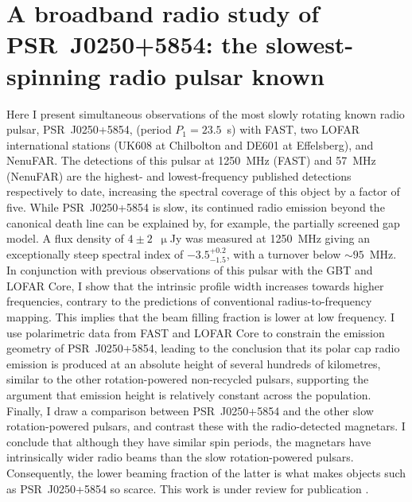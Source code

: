 \chapter[A broadband radio study of PSR~J0250+5854]{A broadband radio study of PSR~J0250+5854: the slowest-spinning radio pulsar known}
\label{chapt: J0250}

Here I present simultaneous observations of the most slowly rotating known radio pulsar, PSR~J0250+5854, (period $P_1 = 23.5$~s) with FAST, two LOFAR international stations (UK608 at Chilbolton and DE601 at Effelsberg), and NenuFAR. The detections of this pulsar at 1250~MHz (FAST) and 57~MHz (NenuFAR) are the highest- and lowest-frequency published detections respectively to date, increasing the spectral coverage of this object by a factor of five. While PSR~J0250+5854 is slow, its continued radio emission beyond the canonical death line can be explained by, for example, the partially screened gap model. A flux density of $4\pm2$~$\upmu$Jy was measured at 1250~MHz giving an exceptionally steep spectral index of $-3.5^{+0.2}_{-1.5}$, with a turnover below $\sim95$~MHz. In conjunction with previous observations of this pulsar with the GBT and LOFAR Core, I show that the intrinsic profile width increases towards higher frequencies, contrary to the predictions of conventional radius-to-frequency mapping. This implies that the beam filling fraction is lower at low frequency. I use polarimetric data from FAST and LOFAR Core to constrain the emission geometry of PSR~J0250+5854, leading to the conclusion that its polar cap radio emission is produced at an absolute height of several hundreds of kilometres, similar to the other rotation-powered non-recycled pulsars, supporting the argument that emission height is relatively constant across the population. Finally, I draw a comparison between PSR~J0250+5854 and the other slow rotation-powered pulsars,  and contrast these with the radio-detected magnetars. I conclude that although they have similar spin periods, the magnetars have intrinsically wider radio beams than the slow rotation-powered pulsars. Consequently, the lower beaming fraction of the latter is what makes objects such as PSR~J0250+5854 so scarce. This work is under review for publication \citep{AWB+2021}.
